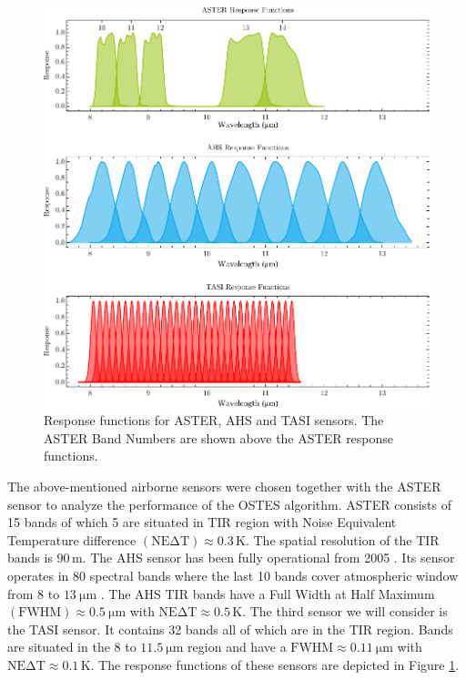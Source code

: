 \begin{figure}[!t]
\centering
\includegraphics[width=0.9\linewidth]{pics/Chapter_04/response_functions_all.pdf}
\vspace{1.5 em}
\caption{Response functions for ASTER, AHS and TASI sensors. The ASTER Band Numbers are shown above the ASTER response functions.}
\label{fig:ResponseFunctions}
\end{figure}
 
The above-mentioned airborne sensors were chosen together with the ASTER sensor to analyze the performance of the OSTES algorithm. ASTER consists of 15 bands of which 5 are situated in TIR region with Noise Equivalent Temperature difference $\mathrm{(NE\Delta T)} \approx 0.3\,\mathrm{K}$. The spatial resolution of the TIR bands is $90\,\mathrm{m}$. The AHS sensor has been fully operational from 2005 \cite{FM05}. Its sensor operates in 80 spectral bands where the last 10 bands cover atmospheric window from 8 to $\SI{13}{\micro\meter}$ \cite{SJ06}. The AHS TIR bands have a  {Full Width at Half Maximum} $\mathrm{(FWHM)} \approx \SI{0.5}{\micro\meter}$ with $\mathrm{NE\Delta T} \approx 0.5\,\mathrm{K}$. The third sensor we will consider is the TASI sensor. It contains 32 bands all of which are in the TIR region. Bands are situated in the 8 to $\SI{11.5}{\micro\meter}$ region and have a $\mathrm{FWHM} \approx \SI{0.11}{\micro\meter}$ with $\mathrm{NE\Delta T} \approx 0.1\,\mathrm{K}$. The response functions of these sensors are depicted in Figure \ref{fig:ResponseFunctions}.

